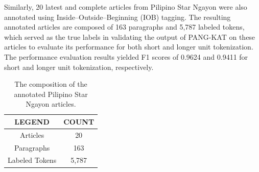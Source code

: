 \documentclass[journal]{./IEEE/IEEEtran}
\begin{document}
\begin{table}[H]
    \centering %
    \captionsetup{justification=centering}
    \caption{Performance evaluation results of PANG-KAT on the NewsPH-NLI Dataset.}  
    \label{tab:effects}
    \vspace{1mm} %
    \renewcommand{\arraystretch}{1.5}
    \fontsize{102pt}{200pt}\selectfont
\end{table}

Similarly, 20 latest and complete articles from Pilipino Star Ngayon were also annotated using Inside–Outside–Beginning (IOB) tagging. The resulting annotated articles are composed of 163 paragraphs and 5,787 labeled tokens, which served as the true labels in validating the output of PANG-KAT on these articles to evaluate its performance for both short and longer unit tokenization. The performance evaluation results yielded F1 scores of 0.9624 and 0.9411 for short and longer unit tokenization, respectively. \\

\begin{table}[H]
    \centering %
    \captionsetup{justification=centering}
    \caption{The composition of the annotated Pilipino Star Ngayon articles.}  \label{tab:effects}
    \vspace{1mm} %
    \renewcommand{\arraystretch}{1.5}
    \fontsize{11pt}{11pt}\selectfont

    \begin{tabular}{|c|c|}
    \hline
    \textbf{LEGEND} & \textbf{COUNT} \\ \hline
    Articles        & 20             \\ \hline
    Paragraphs      & 163            \\ \hline
    Labeled Tokens  & 5,787          \\ \hline
    \end{tabular}
\end{table}
\end{document}
